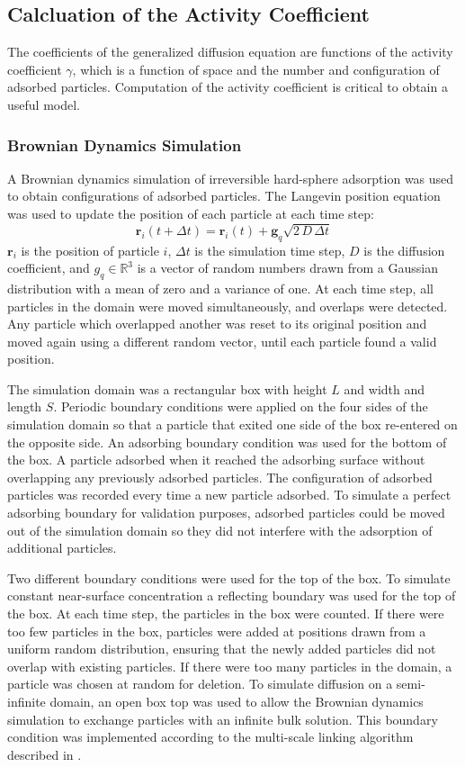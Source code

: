 \subsection{Calcluation of the Activity Coefficient}

The coefficients of the generalized diffusion equation are functions
of the activity coefficient $\gamma$, which is a function of space
and the number and configuration of adsorbed particles. Computation
of the activity coefficient is critical to obtain a useful model. 


\subsubsection{Brownian Dynamics Simulation}

A Brownian dynamics simulation of irreversible hard-sphere adsorption
was used to obtain configurations of adsorbed particles. The Langevin
position equation \cite{Elimelech1998} was used to update the position
of each particle at each time step: \[
\mathbf{r}_{i}(t+\Delta t)=\mathbf{r}_{i}(t)+\mathbf{g}_{q}\sqrt{2\, D\,\Delta t}\]
$\mathbf{r}_{i}$ is the position of particle $i$, $\Delta t$ is
the simulation time step, $D$ is the diffusion coefficient, and $g_{q}\in\mathbb{R}^{3}$
is a vector of random numbers drawn from a Gaussian distribution with
a mean of zero and a variance of one. At each time step, all particles
in the domain were moved simultaneously, and overlaps were detected.
Any particle which overlapped another was reset to its original position
and moved again using a different random vector, until each particle
found a valid position. 

The simulation domain was a rectangular box with height $L$ and width
and length $S$. Periodic boundary conditions were applied on the
four sides of the simulation domain so that a particle that exited
one side of the box re-entered on the opposite side. An adsorbing
boundary condition was used for the bottom of the box. A particle
adsorbed when it reached the adsorbing surface without overlapping
any previously adsorbed particles. The configuration of adsorbed particles
was recorded every time a new particle adsorbed. To simulate a perfect
adsorbing boundary for validation purposes, adsorbed particles could
be moved out of the simulation domain so they did not interfere with
the adsorption of additional particles. 

Two different boundary conditions were used for the top of the box.
To simulate constant near-surface concentration a reflecting boundary
was used for the top of the box. At each time step, the particles
in the box were counted. If there were too few particles in the box,
particles were added at positions drawn from a uniform random distribution,
ensuring that the newly added particles did not overlap with existing
particles. If there were too many particles in the domain, a particle
was chosen at random for deletion. To simulate diffusion on a semi-infinite
domain, an open box top was used to allow the Brownian dynamics simulation
to exchange particles with an infinite bulk solution. This boundary
condition was implemented according to the multi-scale linking algorithm
described in \cite{Magan2004}. 


